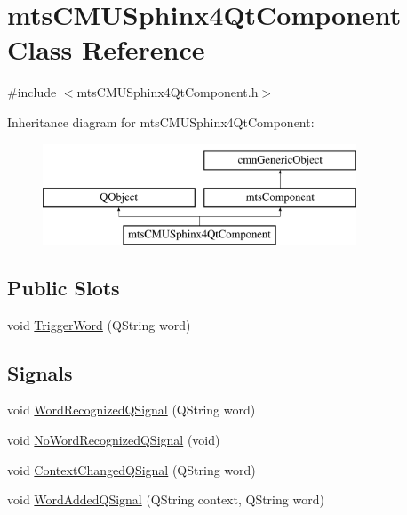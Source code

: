 \hypertarget{classmts_c_m_u_sphinx4_qt_component}{}\section{mts\+C\+M\+U\+Sphinx4\+Qt\+Component Class Reference}
\label{classmts_c_m_u_sphinx4_qt_component}


{\ttfamily \#include $<$mts\+C\+M\+U\+Sphinx4\+Qt\+Component.\+h$>$}

Inheritance diagram for mts\+C\+M\+U\+Sphinx4\+Qt\+Component\+:\begin{figure}[H]
\begin{center}
\leavevmode
\includegraphics[height=3.000000cm]{d1/d5f/classmts_c_m_u_sphinx4_qt_component}
\end{center}
\end{figure}
\subsection*{Public Slots}
\begin{DoxyCompactItemize}
\item 
void \hyperlink{classmts_c_m_u_sphinx4_qt_component_aa42b7b827e6a6c895196bccdafb78834}{Trigger\+Word} (Q\+String word)
\end{DoxyCompactItemize}
\subsection*{Signals}
\begin{DoxyCompactItemize}
\item 
void \hyperlink{classmts_c_m_u_sphinx4_qt_component_a6dd54fb2791af2d253ac75a3a324611f}{Word\+Recognized\+Q\+Signal} (Q\+String word)
\item 
void \hyperlink{classmts_c_m_u_sphinx4_qt_component_abf21d043f3cfc4e590302f7e5ed714c1}{No\+Word\+Recognized\+Q\+Signal} (void)
\item 
void \hyperlink{classmts_c_m_u_sphinx4_qt_component_ac3eb74bab3378f711b830a155502a08f}{Context\+Changed\+Q\+Signal} (Q\+String word)
\item 
void \hyperlink{classmts_c_m_u_sphinx4_qt_component_a7765cc91c694b7a50d55ff1b9145cd12}{Word\+Added\+Q\+Signal} (Q\+String context, Q\+String word)
\end{DoxyCompactItemize}
